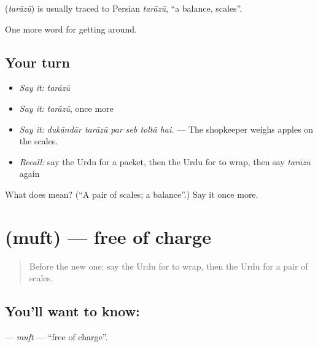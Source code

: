 \begin{cousinweb}
\textbf{} (\emph{tarāzū}) is usually traced to Persian \emph{tarāzū}, \textquotedblleft{}a balance, scales\textquotedblright{}.
\end{cousinweb}

\begin{grammarlens}[title={What you've built}]
One more word for getting around.
\end{grammarlens}

\subsection*{Your turn}
\begin{itemize}
\raggedright
  \item \emph{Say it:} \emph{tarāzū}
  \item \emph{Say it:} \emph{tarāzū}, once more
  \item \emph{Say it:} \emph{dukāndār tarāzū par seb toltā hai.} — The shopkeeper weighs apples on the scales.
  \item \emph{Recall:} say the Urdu for a packet, then the Urdu for to wrap, then say \emph{tarāzū} again
\end{itemize}

\begin{tcolorbox}[breakable,colback=teal!4,colframe=teal!35!black,title={Before you move on}]
What does  mean? (\textquotedblleft{}A pair of scales; a balance\textquotedblright{}.) Say it once more.
\end{tcolorbox}
\section[\texorpdfstring{\ur{مفت} (muft)}{مفت (muft)}]{ (muft) — free of charge}

\label{lesson:UR-C425-muft}



\begin{quote}
Before the new one: say the Urdu for to wrap, then the Urdu for a pair of scales.
\end{quote}

\subsection*{You'll want to know: }
\textbf{} — \emph{muft} — \textquotedblleft{}free of charge\textquotedblright{}.

\begin{quote}
     
\end{quote}

